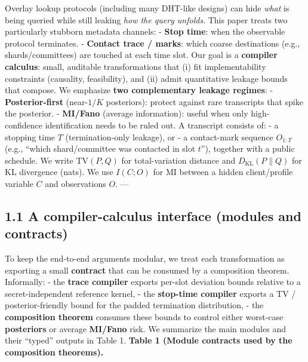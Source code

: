 \documentclass[11pt]{article}
\begin{document}
Overlay lookup protocols (including many DHT-like designs) can hide
\emph{what} is being queried while still leaking \emph{how the query
unfolds}. This paper treats two particularly stubborn metadata channels:
- \textbf{Stop time}: when the observable protocol terminates. -
\textbf{Contact trace / marks}: which coarse destinations (e.g.,
shards/committees) are touched at each time slot. Our goal is a
\textbf{compiler calculus}: small, auditable transformations that (i)
fit implementability constraints (causality, feasibility), and (ii)
admit quantitative leakage bounds that compose. We emphasize \textbf{two
complementary leakage regimes}: - \textbf{Posterior-first} (near-\(1/K\)
posteriors): protect against rare transcripts that spike the posterior.
- \textbf{MI/Fano} (average information): useful when only
high-confidence identification needs to be ruled out. A transcript
consists of: - a stopping time \(T\) (termination-only leakage), or - a
contact-mark sequence \(O_{1:T}\) (e.g., ``which shard/committee was
contacted in slot \(t\)''), together with a public schedule. We write
\(\mathrm{TV}(P,Q)\) for total-variation distance and
\(D_{\mathrm{KL}}(P\|Q)\) for KL divergence (nats). We use \(I(C;O)\)
for MI between a hidden client/profile variable \(C\) and observations
\(O\). ---

\hypertarget{a-compiler-calculus-interface-modules-and-contracts}{%
\subsection{1.1 A compiler-calculus interface (modules and
contracts)}\label{a-compiler-calculus-interface-modules-and-contracts}}

To keep the end-to-end arguments modular, we treat each transformation
as exporting a small \textbf{contract} that can be consumed by a
composition theorem. Informally: - the \textbf{trace compiler} exports
per-slot deviation bounds relative to a secret-independent reference
kernel, - the \textbf{stop-time compiler} exports a TV /
posterior-friendly bound for the padded termination distribution, - the
\textbf{composition theorem} consumes these bounds to control either
worst-case \textbf{posteriors} or average \textbf{MI/Fano} risk. We
summarize the main modules and their ``typed'' outputs in Table 1.
\textbf{Table 1 (Module contracts used by the composition theorems).}
\end{document}
